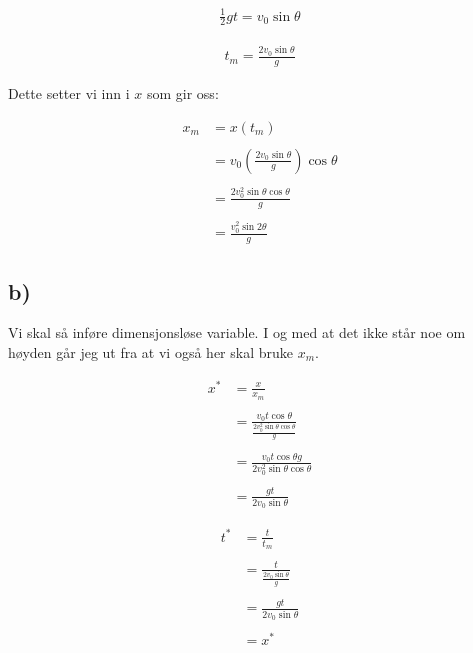 \documentclass{article}
\begin{document}
\begin{align*}
\frac{1}{2}gt  = v_0\sin{\theta}
\end{align*}

\begin{align*}
t_m  = \frac{2v_0\sin{\theta}}{g}
\end{align*}

\bigskip

\begin{flushleft}
Dette setter vi inn i \(x\) som gir oss:
\end{flushleft}

\begin{align*}
x_m & = x(t_m) \\ \\
 & = v_0(\frac{2v_0\sin{\theta}}{g})\cos{\theta} \\ \\
 & = \frac{2v_0^2\sin{\theta}\cos{\theta}}{g} \\ \\
 & = \frac{v_0^2\sin{2\theta}}{g}
\end{align*}

%
%

\subsection*{b)}

\begin{flushleft}
Vi skal så inføre dimensjonsløse variable. I og med at det ikke står noe om høyden går jeg ut fra at vi også her skal bruke \(x_m\).
\end{flushleft}

\begin{multicols}{2}
\begin{align*}
x^* & = \frac{x}{x_m} \\ \\
 & = \frac{v_0 t \cos{\theta}}{\frac{2v_0^2\sin{\theta}\cos{\theta}}{g}} \\ \\
 & = \frac{v_0 t \cos{\theta} g}{2v_0^2\sin{\theta}\cos{\theta}} \\ \\
 & = \frac{gt}{2v_0\sin{\theta}}
\end{align*}

\begin{align*}
t^* & = \frac{t}{t_m} \\ \\
 & = \frac{t}{\frac{2v_0\sin{\theta}}{g}} \\ \\
 & = \frac{gt}{2v_0\sin{\theta}} \\ \\
 & = x^*
\end{align*}
\end{multicols}
\end{document}
